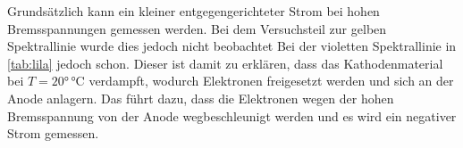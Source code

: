 Grundsätzlich kann ein kleiner entgegengerichteter Strom bei hohen Bremsspannungen gemessen werden. Bei dem Versuchsteil zur gelben Spektrallinie wurde dies jedoch nicht beobachtet 
Bei der violetten Spektrallinie in \autoref{tab:lila} jedoch schon. Dieser ist damit zu erklären, dass das Kathodenmaterial bei $T=20°\,\unit{\celsius}$ 
verdampft, wodurch Elektronen freigesetzt werden und sich an der Anode anlagern. Das führt dazu, dass die Elektronen wegen der hohen Bremsspannung von der 
Anode wegbeschleunigt werden und es wird ein negativer Strom gemessen.